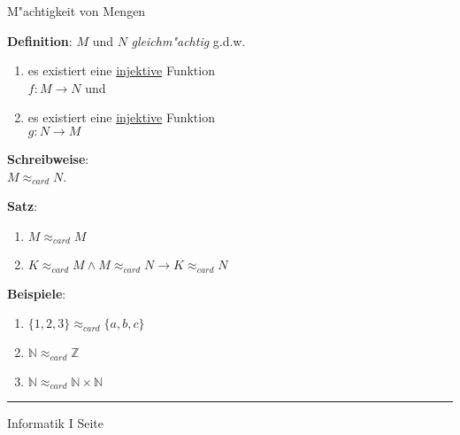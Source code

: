 \begin{slide}{}
\normalsize
\begin{center}
M"achtigkeit von Mengen
\end{center}
\vspace{0.5cm}

\footnotesize
\textbf{Definition}:  $M$ und $N$  \emph{gleichm"achtig} g.d.w.
\begin{enumerate}
\item es existiert eine \underline{injektive} Funktion \\[0.3cm]
      \hspace*{1.3cm} $f: M \rightarrow N$ \quad und
\item es existiert eine \underline{injektive} Funktion \\[0.3cm]
      \hspace*{1.3cm} $g: N \rightarrow M$
\end{enumerate}
\textbf{Schreibweise}: \\[0.3cm]
\hspace*{1.3cm} $M \approx_{card} N$.

\textbf{Satz}: 
\begin{enumerate}
\item $M \approx_{card} M$
\item $K \approx_{card} M \wedge M \approx_{card} N \rightarrow K \approx_{card} N$
\end{enumerate}

\textbf{Beispiele}:
\begin{enumerate}
\item $\{1,2,3\} \approx_{card} \{a,b,c\}$
\item $\mathbb{N} \approx_{card} \mathbb{Z}$
\item $\mathbb{N} \approx_{card} \mathbb{N} \times \mathbb{N}$
\end{enumerate}
\vspace{0.5cm}

\vspace*{\fill}
\tiny \addtocounter{mypage}{1}
\rule{15cm}{1mm}
Informatik I  \hspace*{\fill} Seite 
\end{slide}



